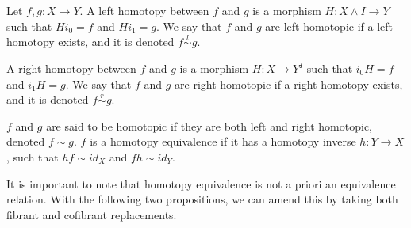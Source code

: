\documentclass[../thesis.tex]{subfiles}
\begin{document}
            \begin{definition}
                Let $f,g: X\rightarrow Y$. A left homotopy between $f$ and $g$ is a morphism $H:X\wedge I \rightarrow Y$ such that $Hi_0 = f$ and $Hi_1 = g$. We say that $f$ and $g$ are left homotopic if a left homotopy exists, and it is denoted $f \overset{l}{\sim} g$.

                \begin{center}
                \end{center}
                
                A right homotopy between $f$ and $g$ is a morphism $H: X \rightarrow Y^I$ such that $i_0H = f$ and $i_1H = g$. We say that $f$ and $g$ are right homotopic if a right homotopy exists, and it is denoted $f \overset{r}{\sim} g$.

                \begin{center}
                \end{center}

                $f$ and $g$ are said to be homotopic if they are both left and right homotopic, denoted $f \sim g$. $f$ is a homotopy equivalence if it has a homotopy inverse $h: Y \rightarrow X$, such that $hf \sim id_X$ and $fh \sim id_Y$. 
            \end{definition}

            It is important to note that homotopy equivalence is not a priori an equivalence relation. With the following two propositions, we can amend this by taking both fibrant and cofibrant replacements.
\end{document}
